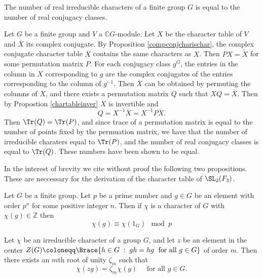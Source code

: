 \documentclass[../Project.tex]{subfiles}
\begin{document}
\begin{prop}[{\cite[Theorem 23.1]{2}}]
\label{realcharirre}
	The number of real irreducible characters of a finite group $G$ is equal to the number of real conjugacy classes.
\end{prop}
\begin{proo*}[{\cite[Theorem 23.1]{2}}]
	Let $G$ be a finite group and $V$ a $\mathbb{C}G$-module. Let $X$ be the character table of $V$ and $\overline{X}$ its complex conjugate. By Proposition \ref{compconjcharischar}, the complex conjugate character table $\overline{X}$ contains the same characters as $X$. Then $PX = \tilde{X}$ for some permutation matrix $P$. For each conjugacy class $g^G$, the entries in the column in $X$ corresponding to $g$ are the complex conjugates of the entries corresponding to the column of $g^{-1}$. Then $\overline{X}$ can be obtained by permuting the columns of $X$, and there exists a permutation matrix $Q$ such that $XQ = \overline{X}$. Then by Propostion \ref{chartableinver} $X$ is invertible and
	$$Q = X^{-1}\overline{X} = X^{-1}P\overline{X}.$$
	Then $\Tr(Q) = \Tr(P)$, and since trace of a permutation matrix is equal to the number of points fixed by the permuation matrix, we have that the number of irreducible charaters equal to $\Tr(P)$, and the number of real conjugacy classes is equal to $\Tr(Q)$. These numbers have been shown to be equal.\\
\end{proo*}

In the interest of brevity we cite without proof the following two propositions. These are neccessary for the derivation of the character table of $\SL_2(F_3)$.

\begin{prop}[{\cite[Corollary 22.27]{2}}]
	\label{22.27}
	Let $G$ be a finite group. Let $p$ be a prime number and $g \in G$ be an element with order $p^n$ for some positive integer $n$. Then if $\chi$ is a character of $G$ with $\chi(g) \in \mathbb{Z}$ then 
	$$\chi(g) \equiv \chi(1_G) \mod p$$
\end{prop}

\begin{prop}
\label{irredcenterroot}
	Let $\chi$ be an irreducible character of a group $G$, and let $z$ be an element in the center $Z(G) \coloneqq \Brace{h \in G \;:\;gh = hg \;\text{ for all } g \in G}$ of order $m$. Then there exists an $m$th root of unity $\zeta_m$ such that
	$$\chi(zg) = \zeta_m\chi(g) \quad \text{ for all } g \in G.$$\\
\end{prop}
\end{document}

